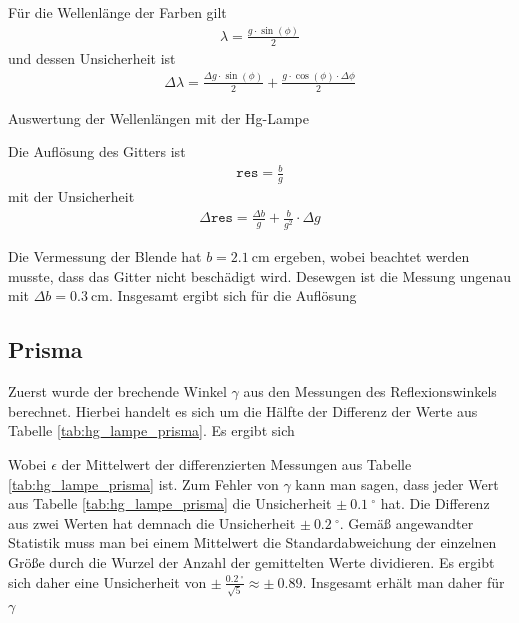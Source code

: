 \documentclass{article}
\begin{document}
Für die Wellenlänge der Farben gilt
\begin{align*}
\lambda = \frac{g\cdot \sin(\phi)}{2}
\end{align*}
und dessen Unsicherheit ist
\begin{align*}
\Delta \lambda = \frac{\Delta g\cdot \sin(\phi)}{2} + \frac{g\cdot \cos(\phi)\cdot \Delta\phi}{2}
\end{align*}



\begin{table}[H]
\caption{Auswertung der Wellenlängen mit der Hg-Lampe}
\label{tab:hg_lampe_auswertung}
\centering

\end{table}


Die Auflösung des Gitters ist
\begin{align*}
\texttt{res} = \frac{b}{g} 
\end{align*}
mit der Unsicherheit
\begin{align*}
\Delta\texttt{res} = \frac{\Delta b}{g} + \frac{b}{g^2}\cdot\Delta g
\end{align*}

Die Vermessung der Blende hat $b=2.1~$cm ergeben, wobei beachtet werden musste, dass das Gitter nicht beschädigt wird. Desewgen ist die Messung ungenau mit $\Delta b = 0.3~$cm.
Insgesamt ergibt sich für die Auflösung



\subsection{Prisma}

Zuerst wurde der brechende Winkel $\gamma$ aus den Messungen des Reflexionswinkels berechnet. Hierbei handelt es sich um die Hälfte der Differenz der Werte aus Tabelle \ref{tab:hg_lampe_prisma}. Es ergibt sich 

Wobei $\epsilon$ der Mittelwert der differenzierten Messungen aus Tabelle \ref{tab:hg_lampe_prisma} ist. Zum Fehler von $\gamma$ kann man sagen, dass jeder Wert aus Tabelle \ref{tab:hg_lampe_prisma} die Unsicherheit $\pm~0.1~^\circ$ hat. Die Differenz aus zwei Werten hat demnach die Unsicherheit $\pm~0.2~^\circ$. Gemäß angewandter Statistik muss man bei einem Mittelwert die Standardabweichung der einzelnen Größe durch die Wurzel der Anzahl der gemittelten Werte dividieren. Es ergibt sich daher eine Unsicherheit von $\pm~\frac{0.2~^\circ}{\sqrt{5}} \approx \pm~0.89$. Insgesamt erhält man daher für $\gamma$

\end{document}
